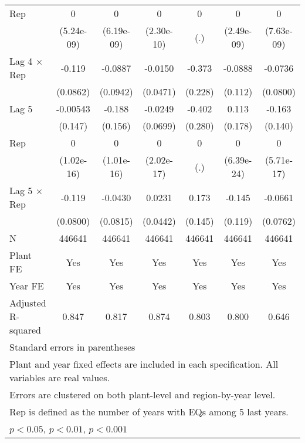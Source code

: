 \begin{table}[htbp]
\begin{tabular}{l*{6}{c}}
\addlinespace
Rep             &        0         &        0         &        0         &        0         &        0         &        0         \\
                &(5.24e-09)         &(6.19e-09)         &(2.30e-10)         &      (.)         &(2.49e-09)         &(7.63e-09)         \\
\addlinespace
Lag 4 $\times$ Rep&   -0.119         &  -0.0887         &  -0.0150         &   -0.373         &  -0.0888         &  -0.0736         \\
                & (0.0862)         & (0.0942)         & (0.0471)         &  (0.228)         &  (0.112)         & (0.0800)         \\
\addlinespace
Lag 5           & -0.00543         &   -0.188         &  -0.0249         &   -0.402         &    0.113         &   -0.163         \\
                &  (0.147)         &  (0.156)         & (0.0699)         &  (0.280)         &  (0.178)         &  (0.140)         \\
\addlinespace
Rep             &        0         &        0         &        0         &        0         &        0         &        0         \\
                &(1.02e-16)         &(1.01e-16)         &(2.02e-17)         &      (.)         &(6.39e-24)         &(5.71e-17)         \\
\addlinespace
Lag 5 $\times$ Rep&   -0.119         &  -0.0430         &   0.0231         &    0.173         &   -0.145         &  -0.0661         \\
                & (0.0800)         & (0.0815)         & (0.0442)         &  (0.145)         &  (0.119)         & (0.0762)         \\
\midrule
N               &   446641         &   446641         &   446641         &   446641         &   446641         &   446641         \\
Plant FE        &      Yes         &      Yes         &      Yes         &      Yes         &      Yes         &      Yes         \\
Year FE         &      Yes         &      Yes         &      Yes         &      Yes         &      Yes         &      Yes         \\
Adjusted R-squared&    0.847         &    0.817         &    0.874         &    0.803         &    0.800         &    0.646         \\
\bottomrule
\multicolumn{7}{l}{\footnotesize Standard errors in parentheses}\\
\multicolumn{7}{l}{\footnotesize Plant and year fixed effects are included in each specification. All variables are real values.}\\
\multicolumn{7}{l}{\footnotesize Errors are clustered on both plant-level and region-by-year level.}\\
\multicolumn{7}{l}{\footnotesize Rep is defined as the number of years with EQs among 5 last years.}\\
\multicolumn{7}{l}{\footnotesize \sym{*} \(p<0.05\), \sym{**} \(p<0.01\), \sym{***} \(p<0.001\)}\\
\end{tabular}
\end{table}
